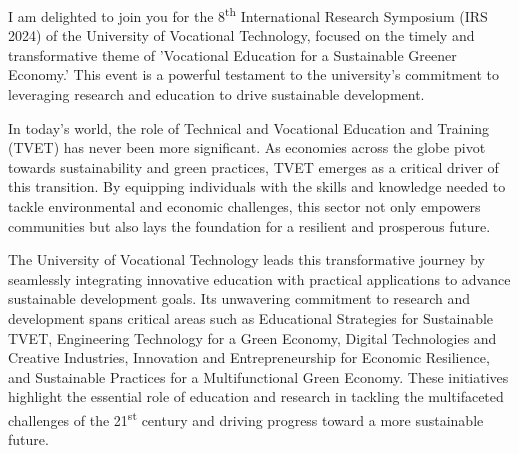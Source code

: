 



\thispagestyle{fancy}
	




   
    



	
	
	I am delighted to join you for the 8\textsuperscript{th} International Research Symposium (IRS 2024) of the University of Vocational Technology, focused on the timely and transformative theme of 'Vocational Education for a Sustainable Greener Economy.' This event is a powerful testament to the university's commitment to leveraging research and education to drive sustainable development.
    
In today’s world, the role of Technical and Vocational Education and Training (TVET) has never been more significant. As economies across the globe pivot towards sustainability and green practices, TVET emerges as a critical driver of this transition. By equipping individuals with the skills and knowledge needed to tackle environmental and economic challenges, this sector not only empowers communities but also lays the foundation for a resilient and prosperous future. 

The University of Vocational Technology leads this transformative journey by seamlessly integrating innovative education with practical applications to advance sustainable development goals. Its unwavering commitment to research and development spans critical areas such as Educational Strategies for Sustainable TVET, Engineering Technology for a Green Economy, Digital Technologies and Creative Industries, Innovation and Entrepreneurship for Economic Resilience, and Sustainable Practices for a Multifunctional Green Economy. These initiatives highlight the essential role of education and research in tackling the multifaceted challenges of the 21\textsuperscript{st} century and driving progress toward a more sustainable future.

